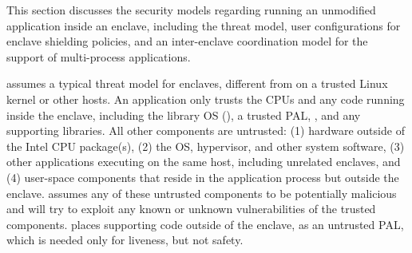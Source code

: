 \label{sec:sgx:security}

This section discusses 
the security models regarding running an unmodified application
inside an enclave, including the threat model,
user configurations for enclave shielding policies,
and an inter-enclave coordination model for the support of
multi-process applications.




\label{sec:sgx:overview:threat}

\graphenesgx{} assumes a typical threat model for \sgx{} enclaves, different from \graphene{} on a trusted Linux kernel or other hosts.
An application only trusts the CPUs and any code running inside the enclave, including the library OS (\thelibos{}), a trusted PAL, \libc{}, and any supporting libraries. 
All other components are untrusted:
(1) hardware outside of the Intel CPU package(s),
(2) the OS, hypervisor, and other system software,
(3) other applications executing on the same host, including unrelated enclaves,
and (4) user-space components that
reside in the application process but outside the enclave.
\graphenesgx{}
assumes any of these untrusted components to be potentially malicious
and will try to exploit
any known or unknown vulnerabilities of the trusted components.
\graphenesgx{} places supporting code outside of the enclave, as an untrusted PAL, which is needed
only for liveness, but not safety.





